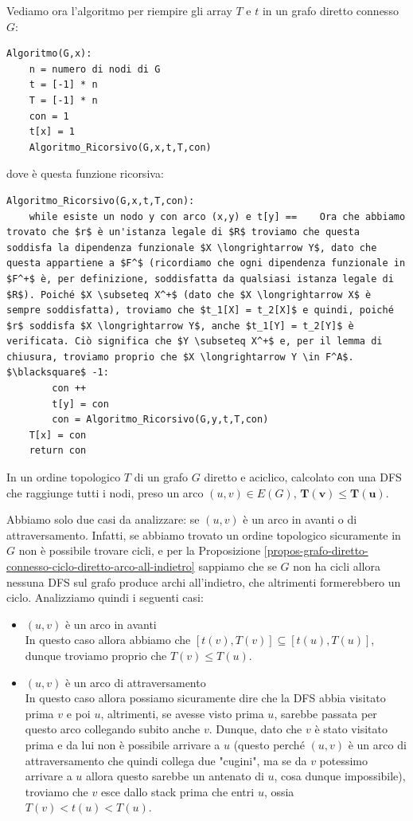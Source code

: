 \documentclass[11pt, a4paper, titlepage, oneside]{scrbook}
\begin{document}
Vediamo ora l'algoritmo per riempire gli array $T$ e $t$ in un grafo diretto connesso $G$:
\begin{lstlisting}[style=Python]
Algoritmo(G,x):
    n = numero di nodi di G
    t = [-1] * n
    T = [-1] * n
    con = 1
    t[x] = 1
    Algoritmo_Ricorsivo(G,x,t,T,con)
\end{lstlisting}
dove  è questa funzione ricorsiva:
\begin{lstlisting}[style=Python]
Algoritmo_Ricorsivo(G,x,t,T,con):
    while esiste un nodo y con arco (x,y) e t[y] ==    Ora che abbiamo trovato che $r$ è un'istanza legale di $R$ troviamo che questa soddisfa la dipendenza funzionale $X \longrightarrow Y$, dato che questa appartiene a $F^$ (ricordiamo che ogni dipendenza funzionale in $F^+$ è, per definizione, soddisfatta da qualsiasi istanza legale di $R$). Poiché $X \subseteq X^+$ (dato che $X \longrightarrow X$ è sempre soddisfatta), troviamo che $t_1[X] = t_2[X]$ e quindi, poiché $r$ soddisfa $X \longrightarrow Y$, anche $t_1[Y] = t_2[Y]$ è verificata. Ciò significa che $Y \subseteq X^+$ e, per il lemma di chiusura, troviamo proprio che $X \longrightarrow Y \in F^A$. $\blacksquare$ -1:
        con ++
        t[y] = con
        con = Algoritmo_Ricorsivo(G,y,t,T,con)
    T[x] = con
    return con
\end{lstlisting}

\begin{Proposizione}[]
\label{propos-tu<tv}
In un ordine topologico $T$ di un grafo $G$ diretto e aciclico, calcolato con una DFS che raggiunge tutti i nodi, preso un arco $(u,v) \in E(G)$, $\bm{T(v) \leq T(u)}$.  
\end{Proposizione}

\Dimostrazione \nopagebreak

Abbiamo solo due casi da analizzare: se $(u,v)$ è un arco in avanti o di attraversamento. Infatti, se abbiamo trovato un ordine topologico sicuramente in $G$ non è possibile trovare cicli, e per la Proposizione \ref{propos-grafo-diretto-connesso-ciclo-diretto-arco-all-indietro} sappiamo che se $G$ non ha cicli allora nessuna DFS sul grafo produce archi all'indietro, che altrimenti formerebbero un ciclo. Analizziamo quindi i seguenti casi:
\begin{itemize}
    \item $(u,v)$ è un arco in avanti \\
    In questo caso allora abbiamo che $[t(v), T(v)] \subseteq [t(u), T(u)]$, dunque troviamo proprio che $T(v) \leq T(u)$.
    \item $(u,v)$ è un arco di attraversamento \\
    In questo caso allora possiamo sicuramente dire che la DFS abbia visitato prima $v$ e poi $u$, altrimenti, se avesse visto prima $u$, sarebbe passata per questo arco collegando subito anche $v$. Dunque, dato che $v$ è stato visitato prima e da lui non è possibile arrivare a $u$ (questo perché $(u,v)$ è un arco di attraversamento che quindi collega due "cugini", ma se da $v$ potessimo arrivare a $u$ allora questo sarebbe un antenato di $u$, cosa dunque impossibile), troviamo che $v$ esce dallo stack prima che entri $u$, ossia $T(v) < t(u) < T(u)$. 
\end{itemize}
\end{document}
